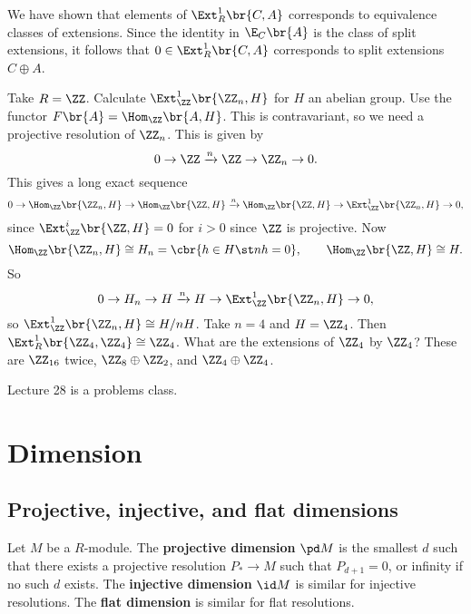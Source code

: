 \pagebreak

We have shown that elements of $ \Ext_R^1\br{C, A} $ corresponds to equivalence classes of extensions. Since the identity in $ \E_C\br{A} $ is the class of split extensions, it follows that $ 0 \in \Ext_R^1\br{C, A} $ corresponds to split extensions $ C \oplus A $.

\begin{example*}
Take $ R = \ZZ $. Calculate $ \Ext_\ZZ^1\br{\ZZ_n, H} $ for $ H $ an abelian group. Use the functor $ F\br{A} = \Hom_\ZZ\br{A, H} $. This is contravariant, so we need a projective resolution of $ \ZZ_n $. This is given by
$$ 0 \to \ZZ \xrightarrow{n} \ZZ \to \ZZ_n \to 0. $$
This gives a long exact sequence
$$ 0 \to \Hom_\ZZ\br{\ZZ_n, H} \to \Hom_\ZZ\br{\ZZ, H} \xrightarrow{n} \Hom_\ZZ\br{\ZZ, H} \to \Ext_\ZZ^1\br{\ZZ_n, H} \to 0, $$
since $ \Ext_\ZZ^i\br{\ZZ, H} = 0 $ for $ i > 0 $ since $ \ZZ $ is projective. Now
$$ \Hom_\ZZ\br{\ZZ_n, H} \cong H_n = \cbr{h \in H \st nh = 0}, \qquad \Hom_\ZZ\br{\ZZ, H} \cong H. $$
So
$$ 0 \to H_n \to H \xrightarrow{n} H \to \Ext_\ZZ^1\br{\ZZ_n, H} \to 0, $$
so $ \Ext_\ZZ^1\br{\ZZ_n, H} \cong H / nH $. Take $ n = 4 $ and $ H = \ZZ_4 $. Then $ \Ext_R^1\br{\ZZ_4, \ZZ_4} \cong \ZZ_4 $. What are the extensions of $ \ZZ_4 $ by $ \ZZ_4 $? These are $ \ZZ_{16} $ twice, $ \ZZ_8 \oplus \ZZ_2 $, and $ \ZZ_4 \oplus \ZZ_4 $.
\end{example*}


Lecture 28 is a problems class.

\pagebreak

\section{Dimension}

\subsection{Projective, injective, and flat dimensions}


\begin{definition}
Let $ M $ be a $ R $-module. The \textbf{projective dimension} $ \pd M $ is the smallest $ d $ such that there exists a projective resolution $ P_* \to M $ such that $ P_{d + 1} = 0 $, or infinity if no such $ d $ exists. The \textbf{injective dimension} $ \id M $ is similar for injective resolutions. The \textbf{flat dimension} is similar for flat resolutions.
\end{definition}

